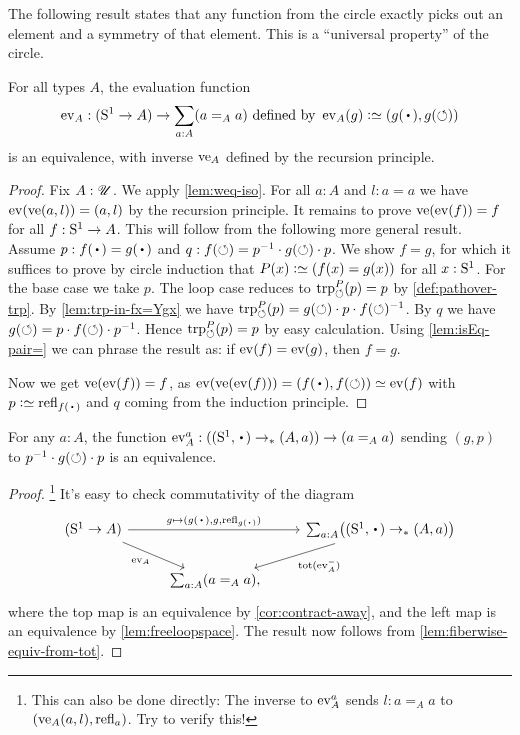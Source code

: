 The following result states that any function from the circle exactly 
picks out an element and a symmetry of that element.
This is a ``universal property'' of the circle.

\begin{lemma}\label{lem:freeloopspace}
For all types $A$, the evaluation function 
\[
\ev_A : (\Sc\to A)\to \sum_{a:A}(a=_Aa)\text{~defined by~} 
\ev_A(g)\defeq (g(\base),g(\Sloop))
\]
is an equivalence, with inverse $\ve_A$ defined by the recursion principle.
\end{lemma}
\begin{proof}
Fix $A:{\mathscr{U}}$. We apply \cref{lem:weq-iso}. 
For all $a:A$ and $l:a=a$ we have $\ev(\ve(a,l))=(a,l)$
by the recursion principle. It remains to prove
$\ve(\ev(f))=f$ for all $f:{\mathrm{S}^1}\to A$. This will follow
from the following more general result. Assume 
$p: f(\base)= g(\base)$ and $q: f(\circlearrowleft) = p^{-1}\cdot g(\circlearrowleft)\cdot p$.
We show $f=g$, for which it suffices to prove by circle induction
that $P(x)\defeq(f(x)=g(x))$ for all $x:{\mathrm{S}^1}$.
For the base case we take $p$.
The loop case reduces to $\trp[P]{\Sloop}(p)=p$ by \cref{def:pathover-trp}.
By \cref{lem:trp-in-fx=Ygx} we have 
$\trp[P]{\Sloop}(p)=g(\Sloop)\cdot p \cdot f(\Sloop)^{-1}$. 
By $q$ we have $g(\circlearrowleft) = p\cdot f(\circlearrowleft) \cdot p^{-1}$.
Hence $\trp[P]{\Sloop}(p)=p$ by easy calculation.
Using \cref{lem:isEq-pair=} we can phrase the result
as: if $\ev(f)=\ev(g)$, then  $f=g$.

Now we get $\ve(\ev(f))=f$, as
$\ev(\ve(\ev(f)))=(f(\base),f(\Sloop))\jdeq\ev(f)$ with $p\defeq\refl{f(\base)}$
and $q$ coming from the induction principle.
\end{proof}
\begin{corollary}\label{cor:circle-loopspace}
  For any $a:A$, the function $\ev_A^a:((\Sc,\base)\to_* (A,a))\to (a=_Aa)$
  sending $(g,p)$ to $p^{-1}\cdot g(\circlearrowleft)\cdot p$ is an equivalence.  
\end{corollary}
\begin{proof}\hskip-5pt\footnote{%
    This can also be done directly:
    The inverse to $\ev_A^a$ sends $l : a=_Aa$
    to $(\ve_A(a,l), \refl{a})$.
    Try to verify this!}
It's easy to check commutativity of the diagram
\[
  \begin{tikzcd}
    (\Sc \to A) \ar[rr,"{g\mapsto(g(\base),g,\refl{g(\base)})}"]
    \ar[dr,"\ev_A"'] & &
    \sum_{a:A}\bigl((\Sc,\base) \ptdto (A,a)\bigr)
    \ar[dl,"\tot(\ev_A^-)"] \\
    &  \,\sum_{a:A}(a=_A a),
  \end{tikzcd}
\]
where the top map is an equivalence by \cref{cor:contract-away},
and the left map is an equivalence by \cref{lem:freeloopspace}.
The result now follows from \cref{lem:fiberwise-equiv-from-tot}.
\end{proof}

